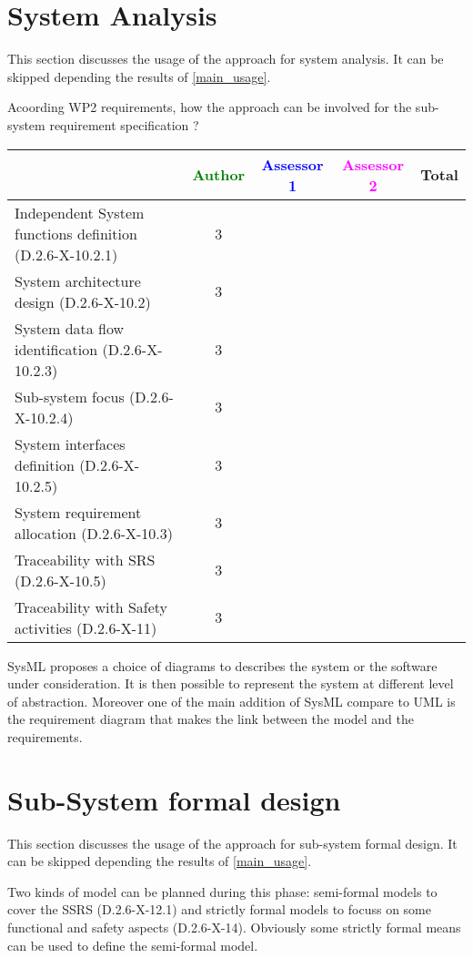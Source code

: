 \section{System Analysis}
This section discusses the usage of the approach for system analysis.
It can be skipped depending the results of \ref{main_usage}.

Acoording WP2 requirements, how the approach can be involved for the sub-system requirement specification ?

\begin{tabular}{|l | c | c | c | c|}
\hline
& \textcolor{green}{Author} & \textcolor{blue}{Assessor 1} & \textcolor{magenta}{Assessor 2} & Total \\
\hline
Independent System functions definition (D.2.6-X-10.2.1)  &3 & & &  \\
\hline 
System architecture design (D.2.6-X-10.2) &3 & & &  \\
\hline
System data flow identification (D.2.6-X-10.2.3)  &3 & & &  \\
\hline
Sub-system focus (D.2.6-X-10.2.4)  &3 & & &  \\
\hline
System interfaces definition (D.2.6-X-10.2.5)  &3 & & &  \\
\hline
System requirement allocation (D.2.6-X-10.3)  &3 & & &  \\
\hline
Traceability with SRS (D.2.6-X-10.5)  &3 & & &  \\
\hline
Traceability with Safety activities (D.2.6-X-11)  &3 & & &  \\
\hline
\end{tabular}
\begin{author_comment}
  SysML proposes a choice of diagrams to describes the system or the
  software under consideration. It is then possible to represent the
  system at different level of abstraction. Moreover one of the main
  addition of SysML compare to UML is the requirement diagram that
  makes the link between the model and the requirements.
\end{author_comment}


\section{Sub-System formal design}
This section discusses the usage of the approach for sub-system formal design.
It can be skipped depending the results of \ref{main_usage}.

Two kinds of model can be planned during this phase: semi-formal models to  cover the SSRS (D.2.6-X-12.1) and strictly formal  models to  focuss on some functional and safety aspects (D.2.6-X-14).  Obviously some strictly  formal means can be used to define the semi-formal  model.

